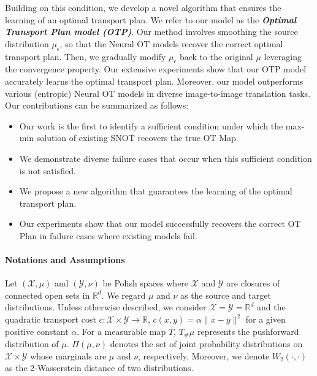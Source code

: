 Building on this condition, we develop a novel algorithm that ensures the learning of an optimal transport plan. We refer to our model as the \textit{\textbf{Optimal Transport Plan model (OTP)}}. Our method involves smoothing the source distribution $\mu_{\epsilon}$, so that the Neural OT models recover the correct optimal transport plan. Then, we gradually modify $\mu_{\epsilon}$ back to the original $\mu$ leveraging the convergence property. Our extensive experiments show that our OTP model accurately learns the optimal transport plan. Moreover, our model outperforms various (entropic) Neural OT models in diverse image-to-image translation tasks. Our contributions can be summarized as follows:
\begin{itemize}[topsep=-2pt, itemsep=-2pt]
    \item Our work is the first to identify a sufficient condition under which the max-min solution of existing SNOT recovers the true OT Map.
    \item We demonstrate diverse failure cases that occur when this sufficient condition is not satisfied.
    \item We propose a new algorithm that guarantees the learning of the optimal transport plan.
    \item Our experiments show that our model successfully recovers the correct OT Plan in failure cases where existing models fail.
\end{itemize}
\vspace{-5pt}
\paragraph{Notations and Assumptions}
Let $(\mathcal{X}, \mu)$ and $(\mathcal{Y}, \nu)$ be Polish spaces where $\mathcal{X}$ and $\mathcal{Y}$ are closures of connected open sets in $\mathbb{R}^d$.
We regard $\mu$ and $\nu$ as the source and target distributions.
Unless otherwise described, we consider $\mathcal{X} = \mathcal{Y} = \mathbb{R}^d$ and the quadratic transport cost $c:\mathcal{X}\times\mathcal{Y}\rightarrow \mathbb{R}$, $c(x,y)= \alpha \lVert x-y \rVert^2$ for a given positive constant $\alpha$.
For a measurable map $T$, $T_{\#}\mu$ represents the pushforward distribution of $\mu$.
$\Pi(\mu, \nu)$ denotes the set of joint probability distributions on $\mathcal{X}\times\mathcal{Y}$ whose marginals are $\mu$ and $\nu$, respectively.
Moreover, we denote $W_2(\cdot, \cdot)$ as the 2-Wasserstein distance of two distributions.
\vspace{-8pt}

